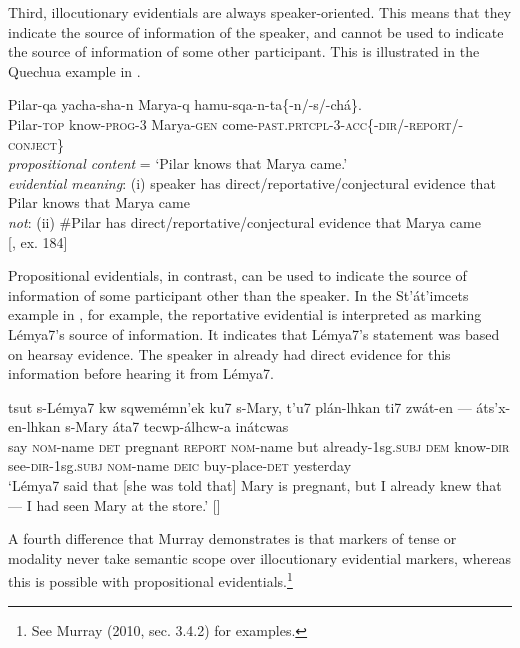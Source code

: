 Third, illocutionary evidentials are always speaker-oriented. This means that they indicate the source of information of the speaker, and cannot be used to indicate the source of information of some other participant. This is illustrated in the Quechua example in .


\ea
\gll Pilar-qa  yacha-sha-n  Marya-q  hamu-sqa-n-ta\{-n/-s/-chá\}.\\
Pilar-\textsc{top}  know-\textsc{prog}-3  Marya-\textsc{gen}  come-\textsc{past.prtcpl}-3-\textsc{acc\{-dir}/-\textsc{report}/-\textsc{conject\}}\\
\glt \textit{propositional content} = ‘Pilar knows that Marya came.’\\
\textit{evidential meaning}: (i) speaker has direct/reportative/conjectural evidence that\\
    Pilar knows that Marya came\\
\textit{not}: (ii) \#Pilar has direct/reportative/conjectural evidence that Marya came\\
     {}[\citealt{Faller2002}, ex. 184]
\z


Propositional evidentials, in contrast, can be used to indicate the source of information of some participant other than the speaker. In the St’át’imcets example in , for example, the reportative evidential is interpreted as marking Lémya7’s source of information. It indicates that Lémya7’s statement was based on hearsay evidence. The speaker in  already had direct evidence for this information before hearing it from Lémya7.


\ea
\gll tsut  s-Lémya7  kw  sqwemémn’ek  ku7  s-Mary,  t’u7  plán-lhkan ti7  zwát-en  —  áts’x-en-lhkan  s-Mary  áta7  tecwp-álhcw-a  inátcwas\\
say  \textsc{nom}-name  \textsc{det}  pregnant  \textsc{report  nom}-name  but  already-1sg.\textsc{subj} \textsc{dem}  know-\textsc{dir}    see-\textsc{dir}-1sg.\textsc{subj}  \textsc{nom}-name  \textsc{deic}  buy-place-\textsc{det}  yesterday\\
\glt ‘Lémya7 said that [she was told that] Mary is pregnant, but I already knew that — I had seen Mary at the store.’   [\citealt{Matthewson2007}]
\z

A fourth difference that Murray demonstrates is that markers of tense or modality never take semantic scope over illocutionary evidential markers, whereas this is possible with propositional evidentials.\footnote{See Murray (2010, sec. 3.4.2) for examples.}



